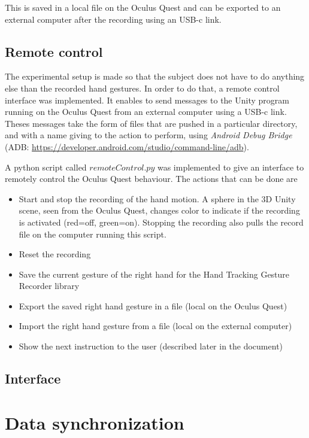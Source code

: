 \documentclass{article}
\begin{document}
This is saved in a local file on the Oculus Quest and can be exported to an external computer after the recording using an USB-c link.


\subsection{Remote control}

The experimental setup is made so that the subject does not have to do anything else than the recorded hand gestures. In order to do that, a remote control interface was implemented. It enables to send messages to the Unity program running on the Oculus Quest from an external computer using a USB-c link. Theses messages take the form of files that are pushed in a particular directory, and with a name giving to the action to perform, using \textit{Android Debug Bridge} (ADB: \url{https://developer.android.com/studio/command-line/adb}).

A python script called $remoteControl.py$ was implemented to give an interface to remotely control the Oculus Quest behaviour. The actions that can be done are
\begin{itemize}
	\item Start and stop the recording of the hand motion. A sphere in the 3D Unity scene, seen from the Oculus Quest, changes color to indicate if the recording is activated (red=off, green=on). Stopping the recording also pulls the record file on the computer running this script.
	\item Reset the recording
	\item Save the current gesture of the right hand for the Hand Tracking Gesture  Recorder library
	\item Export the saved right hand gesture in a file (local on the Oculus Quest)
	\item Import the right hand gesture from a file (local on the external computer)
	\item Show the next instruction to the user (described later in the document)
\end{itemize}

\subsection{Interface}




\section{Data synchronization}
\end{document}
